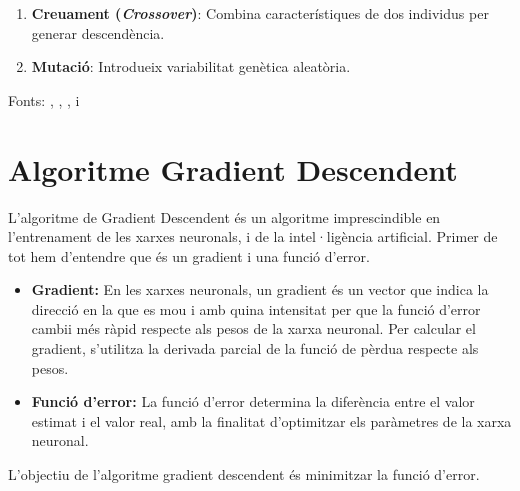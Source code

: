 \begin{enumerate}
\begin{enumerate}
\begin{enumerate}
                \item \textbf{Creuament (\textit{Crossover})}: Combina característiques de dos individus per generar descendència.

                \item \textbf{Mutació}: Introdueix variabilitat genètica aleatòria.
               \end{enumerate}
    \end{enumerate}


\end{enumerate}

Fonts: \cite{Rumelhart1986}, \cite{NIPS2014_f033ed80}, \cite{kingma2022autoencodingvariationalbayes}, \cite{NIPS1999_464d828b} i \cite{Holland:1975}

\section{Algoritme Gradient Descendent}\label{Algoritme_gradient}
   L'algoritme de Gradient Descendent és un algoritme imprescindible en l'entrenament de les xarxes neuronals, i de la intel·ligència artificial. Primer de tot hem d'entendre que és un gradient i una funció d'error.
    \begin{itemize}
     \item \textbf{Gradient: } En les xarxes neuronals, un gradient és un vector que indica la direcció en la que es mou i amb quina intensitat per que la funció d'error cambii més ràpid respecte als pesos de la xarxa neuronal. Per calcular el gradient, s'utilitza la derivada parcial de la funció de pèrdua respecte als pesos.

     \item \textbf{Funció d'error: } La funció d'error determina la diferència entre el valor estimat i el valor real, amb la finalitat d'optimitzar els paràmetres de la xarxa neuronal.
    \end{itemize}

%

         L'objectiu de l'algoritme gradient descendent és minimitzar la funció d'error.




